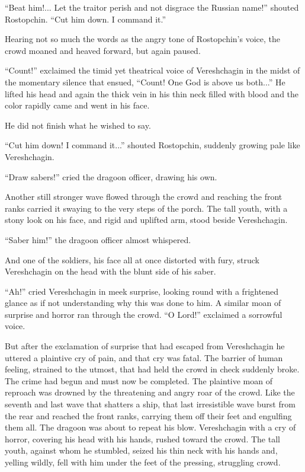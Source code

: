 ``Beat him!... Let the traitor perish and not disgrace the
Russian name!''  shouted Rostopchin. ``Cut him down. I command
it.''

Hearing not so much the words as the angry tone of Rostopchin's
voice, the crowd moaned and heaved forward, but again paused.

``Count!'' exclaimed the timid yet theatrical voice of
Vereshchagin in the midst of the momentary silence that ensued,
``Count! One God is above us both...'' He lifted his head and
again the thick vein in his thin neck filled with blood and the
color rapidly came and went in his face.

He did not finish what he wished to say.

``Cut him down! I command it...'' shouted Rostopchin, suddenly
growing pale like Vereshchagin.

``Draw sabers!'' cried the dragoon officer, drawing his own.

Another still stronger wave flowed through the crowd and reaching
the front ranks carried it swaying to the very steps of the
porch. The tall youth, with a stony look on his face, and rigid
and uplifted arm, stood beside Vereshchagin.

``Saber him!'' the dragoon officer almost whispered.

And one of the soldiers, his face all at once distorted with
fury, struck Vereshchagin on the head with the blunt side of his
saber.

``Ah!'' cried Vereshchagin in meek surprise, looking round with a
frightened glance as if not understanding why this was done to
him. A similar moan of surprise and horror ran through the
crowd. ``O Lord!''  exclaimed a sorrowful voice.

But after the exclamation of surprise that had escaped from
Vereshchagin he uttered a plaintive cry of pain, and that cry was
fatal. The barrier of human feeling, strained to the utmost, that
had held the crowd in check suddenly broke. The crime had begun
and must now be completed. The plaintive moan of reproach was
drowned by the threatening and angry roar of the crowd. Like the
seventh and last wave that shatters a ship, that last
irresistible wave burst from the rear and reached the front
ranks, carrying them off their feet and engulfing them all. The
dragoon was about to repeat his blow. Vereshchagin with a cry of
horror, covering his head with his hands, rushed toward the
crowd. The tall youth, against whom he stumbled, seized his thin
neck with his hands and, yelling wildly, fell with him under the
feet of the pressing, struggling crowd.

